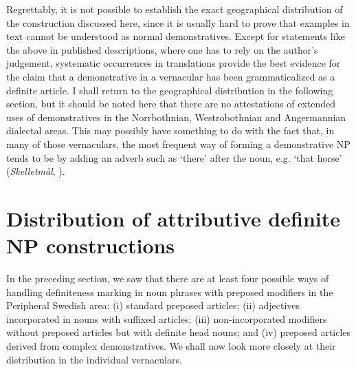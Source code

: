 
Regrettably, it is not possible to establish the exact geographical distribution of the construction discussed here, since it is usually hard to prove that examples in text cannot be understood as normal demonstratives. Except for statements like the above in published descriptions, where one has to rely on the author’s judgement, systematic occurrences in translations provide the best evidence for the claim that a demonstrative in a vernacular has been grammaticalized as a definite article. I shall return to the geographical distribution in the following section, but it should be noted here that there are no attestations of extended uses of demonstratives in the Norrbothnian, Westrobothnian and Angermannian dialectal areas. This may possibly have something to do with the fact that, in many of those vernaculars, the most frequent way of forming a demonstrative NP tends to be by adding an adverb such as  ‘there’ after the noun, e.g.  ‘that horse’ (\textit{Skelletmål}, \citet[41]{Marklund1976}).


\section{Distribution of attributive definite NP constructions}
\label{bkm:Ref141070030}
In the preceding section, we saw that there are at least four possible ways of handling definiteness marking in noun phrases with preposed modifiers in the Peripheral Swedish area: (i) standard preposed articles; (ii) adjectives incorporated in nouns with suffixed articles; (iii) non-incorporated modifiers without preposed articles but with definite head nouns; and (iv) preposed articles derived from complex demonstratives.  We shall now look more closely at their distribution in the individual vernaculars. 


